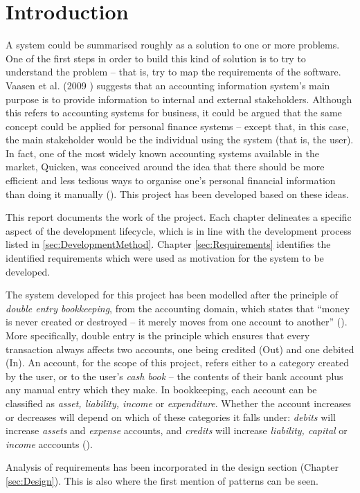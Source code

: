 \section{Introduction} \label{sec:Introduction}

A system could be summarised roughly as a solution to one or more problems. One
of the first steps in order to build this kind of solution is to try to
understand the problem -- that is, try to map the requirements of the software.
Vaasen et al. (2009 \cite[cited][p.~8]{Boczko:2012:IAI:2331376}) suggests that
an accounting information system's main purpose is to provide information to
internal and external stakeholders. Although this refers to accounting systems
for business, it could be argued that the same concept could be applied for
personal finance systems -- except that, in this case, the main stakeholder
would be the individual using the system (that is, the user). In fact, one of
the most widely known accounting systems available in the market,
Quicken\texttrademark, was conceived around the idea that there should be more
efficient and less tedious ways to organise one's personal financial
information than doing it manually (\cite{quicken2017about}). This project has
been developed based on these ideas.

This report documents the work of the project. Each chapter delineates a
specific aspect of the development lifecycle, which is in line with the
development process listed in \ref{sec:DevelopmentMethod}. Chapter
\ref{sec:Requirements} identifies the identified requirements which were used
as motivation for the system to be developed.

The system developed for this project has been modelled after the principle of
\emph{double entry bookkeeping}, from the accounting domain, which states that
``money is never created or destroyed -- it merely moves from one account to
another'' (\cite[][Section 6.2]{fowler1997analysis}). More specifically, double
entry is the principle which ensures that every transaction always affects two
accounts, one being credited (Out) and one debited (In). An account, for the
scope of this project, refers either to a category created by the user, or to
the user's \emph{cash book} -- the contents of their bank account plus any
manual entry which they make. In bookkeeping, each account can be classified as
\emph{asset, liability, income} or \emph{expenditure}. Whether the account
increases or decreases will depend on which of these categories it falls under:
\emph{debits} will increase \emph{assets} and \emph{expense} accounts, and
\emph{credits} will increase \emph{liability, capital} or \emph{income}
acccounts (\cite[][pp.~18-19]{wood2004book}).

Analysis of requirements has been incorporated in the design section (Chapter
\ref{sec:Design}). This is also where the first mention of patterns can be
seen.
